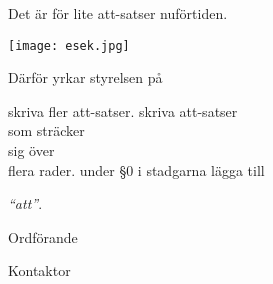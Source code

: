 \documentclass[../_main/handlingar.tex]{subfiles}
\begin{document}

Det är för lite att-satser nuförtiden.

\begin{center}
    \texttt{[image: esek.jpg]}
\end{center}

Därför yrkar styrelsen på
\begin{attsatser}
    \att skriva fler att-satser.
    \att
    skriva att-satser\\
    som sträcker\\
    sig över\\
    flera rader.
    \att under \S0 i stadgarna lägga till\par
    \emph{``att''}.
\end{attsatser}

\begin{signatures}{2}
    \ist
    \signature{\ordf}{Ordförande}
    \signature{\sekr}{Kontaktor}
\end{signatures}
\end{document}
